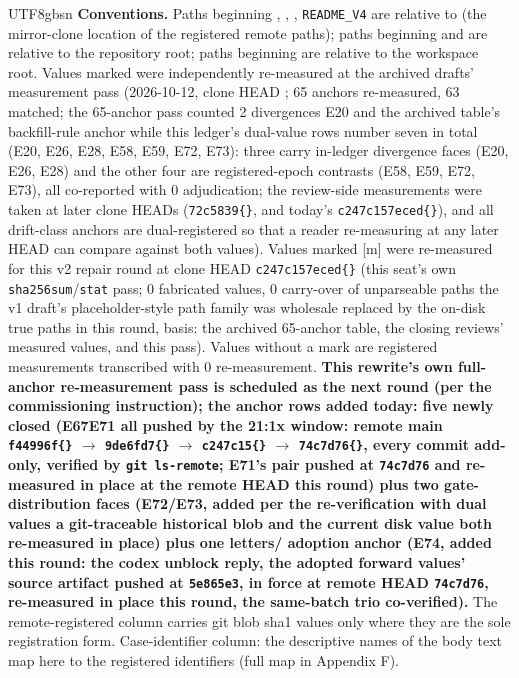 \documentclass[11pt,letterpaper]{article}
\begin{document}
\begin{CJK}{UTF8}{gbsn}
\textbf{Conventions.} Paths beginning , , , \texttt{README\_V4} are relative to  (the mirror-clone location of the registered remote paths); paths beginning  and  are relative to the repository root; paths beginning  are relative to the workspace root. Values marked  were independently re-measured at the archived drafts' measurement pass (2026-10-12, clone HEAD ; 65 anchors re-measured, 63 matched; the 65-anchor pass counted 2 divergences \textemdash{} E20 and the archived table's backfill-rule anchor \textemdash{} while this ledger's dual-value rows number seven in total (E20, E26, E28, E58, E59, E72, E73): three carry in-ledger divergence faces (E20, E26, E28) and the other four are registered-epoch contrasts (E58, E59, E72, E73), all co-reported with 0 adjudication; the review-side measurements were taken at later clone HEADs (\texttt{72c5839\textellipsis\{\}}, and today's \texttt{c247c157eced\textellipsis\{\}}), and all drift-class anchors are dual-registered so that a reader re-measuring at any later HEAD can compare against both values). Values marked [m] were re-measured for this v2 repair round at clone HEAD \texttt{c247c157eced\textellipsis\{\}} (this seat's own \texttt{sha256sum}/\texttt{stat} pass; 0 fabricated values, 0 carry-over of unparseable paths \textemdash{} the v1 draft's placeholder-style path family was wholesale replaced by the on-disk true paths in this round, basis: the archived 65-anchor table, the closing reviews' measured values, and this pass). Values without a mark are registered measurements transcribed with 0 re-measurement. \textbf{This rewrite's own full-anchor re-measurement pass is scheduled as the next round (per the commissioning instruction); the anchor rows added today: five newly closed (E67\textendash{}E71 \textemdash{} all pushed by the 21:1x window: remote main \texttt{f44996f\textellipsis\{\}} \ensuremath{\to} \texttt{9de6fd7\textellipsis\{\}} \ensuremath{\to} \texttt{c247c15\textellipsis\{\}} \ensuremath{\to} \texttt{74c7d76\textellipsis\{\}}, every commit add-only, verified by \texttt{git ls-remote}; E71's pair pushed at \texttt{74c7d76} and re-measured in place at the remote HEAD this round) plus two gate-distribution faces (E72/E73, added per the re-verification with dual values \textemdash{} a git-traceable historical blob and the current disk value \textemdash{} both re-measured in place) plus one letters/ adoption anchor (E74, added this round: the codex unblock reply, the adopted forward values' source artifact \textemdash{} pushed at \texttt{5e865e3}, in force at remote HEAD \texttt{74c7d76}, re-measured in place this round, the same-batch trio co-verified).} The remote-registered column carries git blob sha1 values only where they are the sole registration form. Case-identifier column: the descriptive names of the body text map here to the registered identifiers (full map in Appendix F).


\end{CJK}
\end{document}
